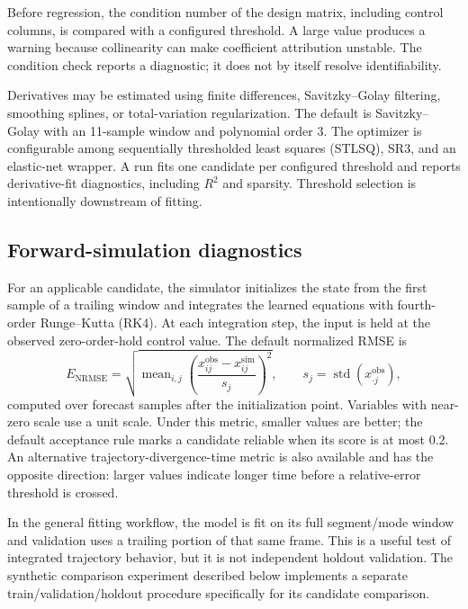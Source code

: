 \documentclass[11pt]{article}
\begin{document}
Before regression, the condition number of the design matrix, including control columns, is compared with a configured threshold. A large value produces a warning because collinearity can make coefficient attribution unstable. The condition check reports a diagnostic; it does not by itself resolve identifiability.

Derivatives may be estimated using finite differences, Savitzky--Golay filtering, smoothing splines, or total-variation regularization. The default is Savitzky--Golay with an 11-sample window and polynomial order 3. The optimizer is configurable among sequentially thresholded least squares (STLSQ), SR3, and an elastic-net wrapper. A run fits one candidate per configured threshold and reports derivative-fit diagnostics, including $R^2$ and sparsity. Threshold selection is intentionally downstream of fitting.

\subsection{Forward-simulation diagnostics}

For an applicable candidate, the simulator initializes the state from the first sample of a trailing window and integrates the learned equations with fourth-order Runge--Kutta (RK4). At each integration step, the input is held at the observed zero-order-hold control value. The default normalized RMSE is
\begin{equation}
  E_{\mathrm{NRMSE}} = \sqrt{\operatorname{mean}_{i,j}
  \left(\frac{x_{ij}^{\mathrm{obs}}-x_{ij}^{\mathrm{sim}}}{s_j}\right)^2},
  \qquad s_j=\operatorname{std}(x_{\cdot j}^{\mathrm{obs}}),
  \label{eq:nrmse}
\end{equation}
computed over forecast samples after the initialization point. Variables with near-zero scale use a unit scale. Under this metric, smaller values are better; the default acceptance rule marks a candidate reliable when its score is at most 0.2. An alternative trajectory-divergence-time metric is also available and has the opposite direction: larger values indicate longer time before a relative-error threshold is crossed.

In the general fitting workflow, the model is fit on its full segment/mode window and validation uses a trailing portion of that same frame. This is a useful test of integrated trajectory behavior, but it is not independent holdout validation. The synthetic comparison experiment described below implements a separate train/validation/holdout procedure specifically for its candidate comparison.
\end{document}
